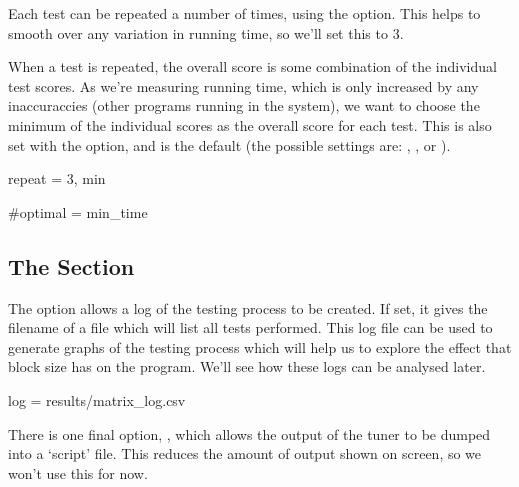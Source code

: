 \documentclass[a4paper]{article}
\begin{document}
Each test can be repeated a number of times, using the  
option. This helps to smooth over any variation in running time, so we'll set 
this to 3.

When a test is repeated, the overall score is some combination of the 
individual test scores. As we're measuring running time, which is only 
increased by any inaccuraccies (other programs running in the system), we 
want to choose the minimum of the individual scores as the overall score for 
each test. This is also set with the  option, and 
 is the default (the possible settings are: 
, ,  or ).
\begin{Code}[numbers=none]
repeat = 3, min

#optimal = min_time
\end{Code}



\subsection{The \confsnippet{[output]} Section}
The  option allows a log of the testing process to be 
created. If set, it gives the filename of a  file which 
will list all tests performed. This log file can be used to generate graphs of 
the testing process which will help us to explore the effect that block size 
has on the program. 
We'll see how these logs can be analysed later.
\begin{Code}[numbers=none]
log = results/matrix_log.csv
\end{Code}

There is one final option, , which allows the output of 
the tuner to be dumped into a `script' file. This reduces the amount of output 
shown on screen, so we won't use this for now.
\end{document}
